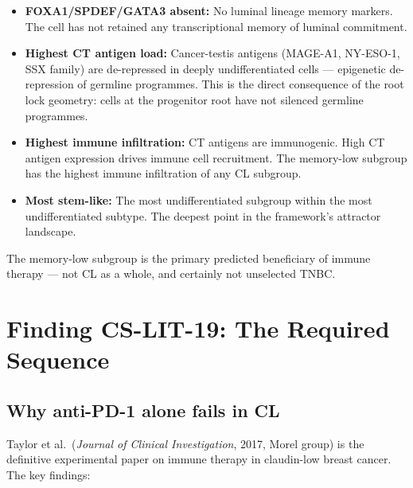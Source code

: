 \documentclass[12pt, a4paper]{article}
\begin{document}
\begin{itemize}
    \item \textbf{FOXA1/SPDEF/GATA3 absent:}
    No luminal lineage memory markers. The cell has
    not retained any transcriptional memory of
    luminal commitment.
    \item \textbf{Highest CT antigen load:}
    Cancer-testis antigens (MAGE-A1, NY-ESO-1,
    SSX family) are de-repressed in deeply
    undifferentiated cells --- epigenetic
    de-repression of germline programmes. This
    is the direct consequence of the root lock
    geometry: cells at the progenitor root have
    not silenced germline programmes.
    \item \textbf{Highest immune infiltration:}
    CT antigens are immunogenic. High CT antigen
    expression drives immune cell recruitment.
    The memory-low subgroup has the highest
    immune infiltration of any CL subgroup.
    \item \textbf{Most stem-like:}
    The most undifferentiated subgroup within
    the most undifferentiated subtype. The deepest
    point in the framework's attractor landscape.
\end{itemize}

The memory-low subgroup is the primary predicted
beneficiary of immune therapy --- not CL as a
whole, and certainly not unselected TNBC.

\section{Finding CS-LIT-19: The Required Sequence}

\subsection{Why anti-PD-1 alone fails in CL}

Taylor et al.\ (\textit{Journal of Clinical
Investigation}, 2017, Morel group) is the
definitive experimental paper on immune therapy
in claudin-low breast cancer. The key findings:
\end{document}
